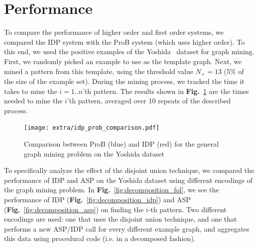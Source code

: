 \section{Performance}\label{sec:performance}
To compare the performance of higher order and first order systems, we compared the IDP system with the ProB system (which uses higher order).
To this end, we used the positive examples of the Yoshida~\citep{yoshida_dataset} dataset for graph mining.
First, we randomly picked an example to use as the template graph.
Next, we mined a pattern from this template, using the threshold value $N_{+} = 13$ (5\% of the size of the example set).
During the mining process, we tracked the time it takes to mine the $i=1..n$'th pattern.
The results shown in \textbf{Fig.}~\ref{fig:ProBIDPComp} are the times needed to mine the $i$'th pattern, averaged over 10 repeats of the described process.

\begin{figure}[thb]
\texttt{[image: extra/idp\_prob\_comparison.pdf]}
\caption{\footnotesize{Comparison between ProB (blue) and IDP (red) for the general graph mining problem on the Yoshida dataset} }
\label{fig:ProBIDPComp}
\end{figure}



To specifically analyze the effect of the disjoint union technique, we compared the performance of IDP and ASP on the Yoshida dataset using different encodings of the graph mining problem.
In \textbf{Fig.}~\ref{fig:decomposition_fol}, we see the performance of IDP (\textbf{Fig.}~\ref{fig:decomposition_idp}) and ASP (\textbf{Fig.}~\ref{fig:decomposition_asp}) on finding the $i$-th pattern.
Two different encodings are used: one that uses the disjoint union technique, and one that performs a new ASP/IDP call for every different example graph, and aggregates this data using procedural code (i.e. in a decomposed fashion).


